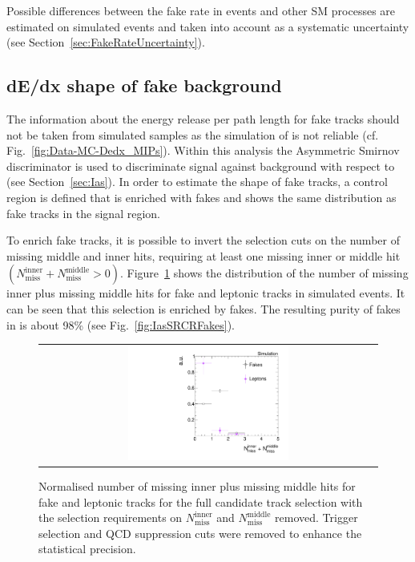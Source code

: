 Possible differences between the fake rate in \Zlep events and other SM processes are estimated on simulated events and taken into account as a systematic uncertainty (see Section~\ref{sec:FakeRateUncertainty}).

\subsection{dE/dx shape of fake background}
The information about the energy release per path length for fake tracks should not be taken from simulated samples as the simulation of \dedx is not reliable (cf. Fig.~\ref{fig:Data-MC-Dedx_MIPs}).
Within this analysis the Asymmetric Smirnov discriminator \ias is used to discriminate signal against background with respect to \dedx (see Section~\ref{sec:Ias}). 
In order to estimate the \ias shape of fake tracks, a control region \fakeCR is defined that is enriched with fakes and shows the same \ias distribution as fake tracks in the signal region.

To enrich fake tracks, it is possible to invert the selection cuts on the number of missing middle and inner hits, \ie requiring at least one missing inner or middle hit $\left( N_{\text{miss}}^{\text{inner}} +N_{\text{miss}}^{\text{middle}}>0\right)$.
Figure~\ref{fig:NMissInnerAndMiddle} shows the distribution of the number of missing inner plus missing middle hits for fake and leptonic tracks in simulated \WJets events.
It can be seen that this selection is enriched by fakes.
The resulting purity of fakes in \fakeCR is about 98\% (see Fig.~\ref{fig:IasSRCRFakes}). 
\begin{figure}[!t]
  \centering 
  \begin{tabular}{c}
    \includegraphics[width=0.49\textwidth]{figures/analysis_2/Background/NLostInnerPlusMiddleForAllBkg_chiTracksQCDsupressionTrigger.pdf}
  \end{tabular}
  \caption{Normalised number of missing inner plus missing middle hits for fake and leptonic tracks for the full candidate track selection with the selection requirements on $N_{\text{miss}}^{\text{inner}}$ and $N_{\text{miss}}^{\text{middle}}$ removed. Trigger selection and QCD suppression cuts were removed to enhance the statistical precision.}
  \label{fig:NMissInnerAndMiddle}
\end{figure}

